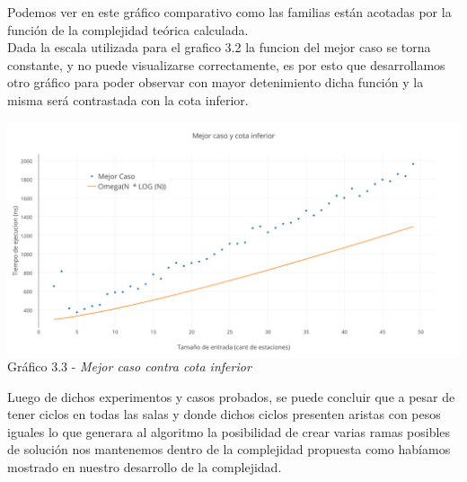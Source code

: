 Podemos ver en este gr\'afico comparativo como las familias est\'an acotadas por la funci\'on de la complejidad te\'orica calculada.\\
  
Dada la escala utilizada para el grafico 3.2 la funcion del mejor caso se torna constante, y no puede visualizarse correctamente, es por esto que desarrollamos otro gr\'afico para poder observar con mayor detenimiento dicha funci\'on y la misma ser\'a contrastada con la cota inferior.
  
  \vspace*{0.3cm} \vspace*{0.3cm}
  \begin{center}
\includegraphics[scale=0.5]{./EJ3/Mejorcasoycotainferior.png}
{Gr\'afico 3.3 - \textit{Mejor caso contra cota inferior}}
  \end{center}
  \vspace*{0.3cm}

  
Luego de dichos experimentos y casos probados, se puede concluir que a pesar de tener ciclos en todas las salas y donde dichos ciclos presenten aristas con pesos iguales lo que generara al algoritmo la posibilidad de crear varias ramas posibles de soluci\'on nos mantenemos dentro de la complejidad propuesta como hab\'iamos mostrado en nuestro desarrollo de la complejidad.\\
